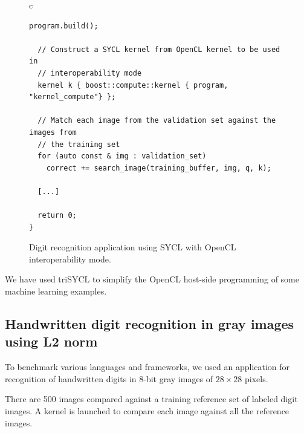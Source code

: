 \documentclass[sigplan, review, authordraft]{acmart}
\begin{document}
\begin{figure}
\begin{tabular}{c}
\begin{lstlisting}[basicstyle=\scriptsize]
  program.build();

  // Construct a SYCL kernel from OpenCL kernel to be used in
  // interoperability mode
  kernel k { boost::compute::kernel { program, "kernel_compute"} };

  // Match each image from the validation set against the images from
  // the training set
  for (auto const & img : validation_set)
    correct += search_image(training_buffer, img, q, k);

  [...]

  return 0;
}
    \end{lstlisting}
  \end{tabular}
  \caption{Digit recognition application using SYCL with OpenCL
    interoperability mode.\label{fig:digit-SYCL-OpenCL-code}}
\end{figure}

We have used triSYCL to simplify the OpenCL host-side programming of
some machine learning examples.


\subsection{Handwritten digit recognition in gray images using L2
  norm}
\label{sec:example-from-anast}

To benchmark various languages and frameworks, we used an application
for recognition of handwritten digits in 8-bit gray images of
$28 \times 28$ pixels.

There are 500 images compared against a training reference
set of labeled digit images. A kernel is launched to compare each
image against all the reference images.
\end{document}
